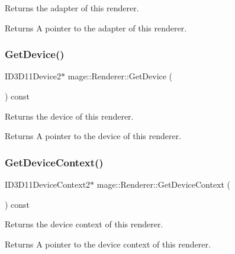 Returns the adapter of this renderer.

\begin{DoxyReturn}{Returns}
A pointer to the adapter of this renderer. 
\end{DoxyReturn}
\hypertarget{classmage_1_1_renderer_a9510b8784447ed0fa9b43e7a4bf1fc80}{}\label{classmage_1_1_renderer_a9510b8784447ed0fa9b43e7a4bf1fc80} 
\subsubsection{\texorpdfstring{Get\+Device()}{GetDevice()}}
{\footnotesize\ttfamily I\+D3\+D11\+Device2$\ast$ mage\+::\+Renderer\+::\+Get\+Device (\begin{DoxyParamCaption}{ }\end{DoxyParamCaption}) const\hspace{0.3cm}{\ttfamily [noexcept]}}

Returns the device of this renderer.

\begin{DoxyReturn}{Returns}
A pointer to the device of this renderer. 
\end{DoxyReturn}
\hypertarget{classmage_1_1_renderer_a13df5f31b3d18d2f4428743ebd7ffbe5}{}\label{classmage_1_1_renderer_a13df5f31b3d18d2f4428743ebd7ffbe5} 
\subsubsection{\texorpdfstring{Get\+Device\+Context()}{GetDeviceContext()}}
{\footnotesize\ttfamily I\+D3\+D11\+Device\+Context2$\ast$ mage\+::\+Renderer\+::\+Get\+Device\+Context (\begin{DoxyParamCaption}{ }\end{DoxyParamCaption}) const\hspace{0.3cm}{\ttfamily [noexcept]}}

Returns the device context of this renderer.

\begin{DoxyReturn}{Returns}
A pointer to the device context of this renderer. 
\end{DoxyReturn}
\hypertarget{classmage_1_1_renderer_adc6940516d809d1916c627d6ce3837fe}{}\label{classmage_1_1_renderer_adc6940516d809d1916c627d6ce3837fe} 
